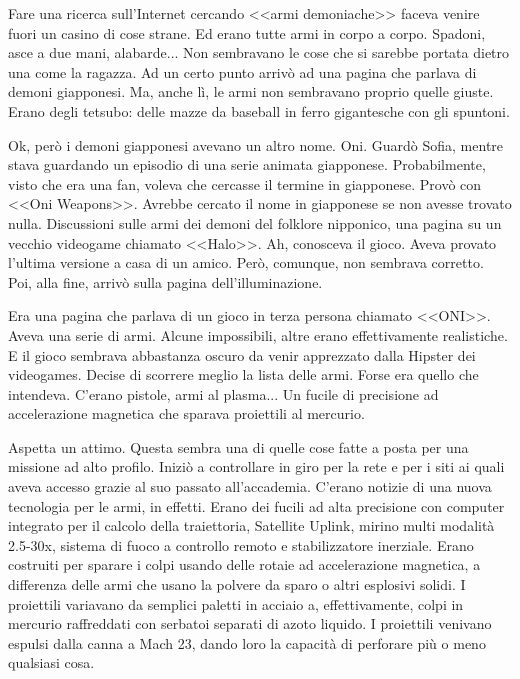     Fare una ricerca sull'Internet cercando <<armi demoniache>> faceva venire fuori un casino di cose strane. Ed erano
    tutte armi in corpo a corpo. Spadoni, asce a due mani, alabarde... Non sembravano le cose che si sarebbe portata
    dietro una come la ragazza. Ad un certo punto arrivò ad una pagina che parlava di demoni giapponesi. Ma, anche lì,
    le armi non sembravano proprio quelle giuste. Erano degli tetsubo: delle mazze da baseball in ferro gigantesche con
    gli spuntoni.

    Ok, però i demoni giapponesi avevano un altro nome. Oni. Guardò Sofia, mentre stava guardando un episodio di una
    serie animata giapponese. Probabilmente, visto che era una fan, voleva che cercasse il termine in giapponese. Provò
    con <<Oni Weapons>>. Avrebbe cercato il nome in giapponese se non avesse trovato nulla. Discussioni sulle armi dei
    demoni del folklore nipponico, una pagina su un vecchio videogame chiamato <<Halo>>. Ah, conosceva il gioco. Aveva
    provato l'ultima versione a casa di un amico. Però, comunque, non sembrava corretto. Poi, alla fine, arrivò sulla
    pagina dell'illuminazione.

    Era una pagina che parlava di un gioco in terza persona chiamato <<ONI>>. Aveva una serie di armi. Alcune
    impossibili, altre erano effettivamente realistiche. E il gioco sembrava abbastanza oscuro da venir apprezzato dalla
    Hipster dei videogames. Decise di scorrere meglio la lista delle armi. Forse era quello che intendeva. C'erano
    pistole, armi al plasma... Un fucile di precisione ad accelerazione magnetica che sparava proiettili al mercurio.

    Aspetta un attimo. Questa sembra una di quelle cose fatte a posta per una missione ad alto profilo. Iniziò a
    controllare in giro per la rete e per i siti ai quali aveva accesso grazie al suo passato all'accademia. C'erano
    notizie di una nuova tecnologia per le armi, in effetti. Erano dei fucili ad alta precisione con computer integrato
    per il calcolo della traiettoria, Satellite Uplink, mirino multi modalità 2.5-30x, sistema di fuoco a controllo
    remoto e stabilizzatore inerziale. Erano costruiti per sparare
    i colpi usando delle rotaie ad accelerazione magnetica, a differenza delle armi che usano la polvere da sparo o
    altri esplosivi solidi. I proiettili variavano da semplici paletti in acciaio a, effettivamente, colpi in mercurio
    raffreddati con serbatoi separati di azoto liquido. I proiettili venivano espulsi dalla canna a Mach 23, dando loro
    la capacità di perforare più o meno qualsiasi cosa.

